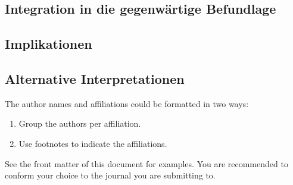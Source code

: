 \subsection{Integration in die gegenwärtige Befundlage}

\subsection{Implikationen}

\subsection{Alternative Interpretationen}

The author names and affiliations could be formatted in two ways:
\begin{enumerate}[(1)]
\item Group the authors per affiliation.
\item Use footnotes to indicate the affiliations.
\end{enumerate}
See the front matter of this document for examples. You are recommended to conform your choice to the journal you are submitting to.

